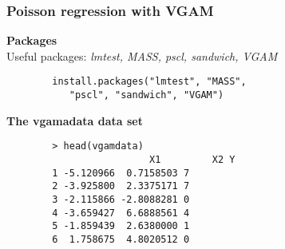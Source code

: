 \documentclass{beamer}
\begin{document}
	\begin{frame}[fragile]
\frametitle{Poisson regression with VGAM}
	\textbf{Packages}	\\
		Useful packages: \textit{lmtest, MASS,  pscl, sandwich, VGAM}
		\begin{framed}
		\begin{verbatim}
		install.packages("lmtest", "MASS", 
		   "pscl", "sandwich", "VGAM")
		\end{verbatim}
		\end{framed}
		
	\end{frame}
	\begin{frame}[fragile]
		\textbf{The vgamadata data set}
		\Large
		\begin{verbatim}
		> head(vgamdata)
				         X1         X2 Y
		1 -5.120966  0.7158503 7
		2 -3.925800  2.3375171 7
		3 -2.115866 -2.8088281 0
		4 -3.659427  6.6888561 4
		5 -1.859439  2.6380000 1
		6  1.758675  4.8020512 0
		
		\end{verbatim}
	\end{frame}
%		
%		
%		
\end{document}
